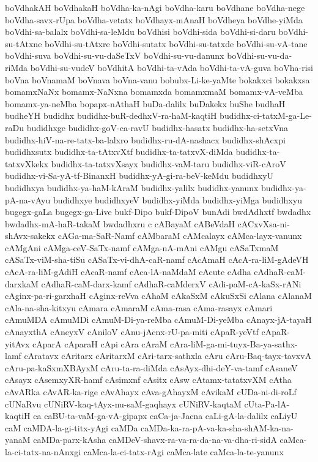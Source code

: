 {boVdhakAH
boVdhakaH
boVdha-ka-nAgi
boVdha-karu
boVdhane
boVdha-nege
boVdha-savx-rUpa
boVdha-vetatx
boVdhayx-mAnaH
boVdheya
boVdhe-yiMda
boVdhi-sa-balalx
boVdhi-sa-leMdu
boVdhisi
boVdhi-sida
boVdhi-si-daru
boVdhi-su-tAtxne
boVdhi-su-tAtxre
boVdhi-sutatx
boVdhi-su-tatxde
boVdhi-su-vA-tane
boVdhi-suva
boVdhi-su-vu-daSeTxV
boVdhi-su-vu-danunx
boVdhi-su-vu-da-riMda
boVdhi-su-vudeV
boVdhitA
boVdhi-ta-vAda
boVdhi-ta-vA-guva
boVha-risi
boVna
boVnamaM
boVnava
boVna-vanu
bobubx-Li-ke-yaMte
bokakxci
bokakxsa
bomamxNaNx
bomamx-NaNxna
bomamxda
bomamxmaM
bomamx-vA-veMba
bomamx-ya-neMba
bopapx-nAthaH
buDa-dalilx
buDakekx
buShe
budhaH
budheYH
budidhx
budidhx-buR-dedhxV-ra-haM-kaqtiH
budidhx-ci-tatxM-ga-Le-raDu
budidhxge
budidhx-goV-ca-ravU
budidhx-hasatx
budidhx-ha-setxVna
budidhx-hiV-na-re-tatx-ba-lalxro
budidhx-ru-dA-nashacx
budidhx-shAcxpi
budidhxsutx
budidhx-ta-tAtxvXtf
budidhx-ta-tatxvX-diMda
budidhx-ta-tatxvXkekx
budidhx-ta-tatxvXsayx
budidhx-vaM-taru
budidhx-viR-cAroV
budidhx-vi-Sa-yA-tf-BinanxH
budidhx-yA-gi-ra-beV-keMdu
budidhxyU
budidhxya
budidhx-ya-haM-kAraM
budidhx-yalilx
budidhx-yanunx
budidhx-ya-pA-na-vAyu
budidhxye
budidhxyeV
budidhx-yiMda
budidhx-yiMga
budidhxyu
bugegx-gaLa
bugegx-ga-Live
bukf-Dipo
bukf-DipoV
bunAdi
bwdAdhxtf
bwdadhx
bwdadhx-mA-haR-takaM
bwdadhxru
c
cABayaM
cABeVdaH
cACxvXsa-ni-shAvx-sakekx
cAGa-ma-SaR-Namf
cAMbaraM
cAMcalayx
cAMca-layx-vanunx
cAMgAni
cAMga-ceV-SaTx-namf
cAMga-nA-mAni
cAMgu
cASaTxmaM
cASaTx-viM-sha-tiSu
cASaTx-vi-dhA-caR-namf
cAcAmaH
cAcA-ra-liM-gAdeVH
cAcA-ra-liM-gAdiH
cAcaR-namf
cAca-lA-naMdaM
cAcute
cAdha
cAdhaR-caM-darxkaM
cAdhaR-caM-darx-kamf
cAdhaR-caMderxV
cAdi-paM-cA-kaSx-rANi
cAginx-pa-ri-garxhaH
cAginx-reVva
cAhaM
cAkaSxM
cAkuSxSi
cAlana
cAlanaM
cAla-na-sha-kitxyu
cAmara
cAmaraM
cAma-rasa
cAma-rasayx
cAmari
cAmuMDA
cAmuMDi
cAmuM-Di-ya-reMba
cAmuM-Di-yeMba
cAnayx-jA-tayaH
cAnayxthA
cAneyxV
cAniloV
cAnu-jAcnx-rU-pa-miti
cApaR-yeVtf
cApaR-yitAvx
cAparA
cAparaH
cApi
cAra
cAraM
cAra-liM-ga-mi-tuyx-Ba-ya-sathx-lamf
cAratavx
cAritarx
cAritarxM
cAri-tarx-sathxla
cAru
cAru-Baq-tayx-tavxvA
cAru-pa-kaSxmXBAyxM
cAru-ta-ra-diMda
cAsAyx-dhi-deY-va-tamf
cAsaneV
cAsayx
cAsemxyXR-hamf
cAsimxnf
cAsitx
cAsw
cAtamx-tatatxvXM
cAtha
cAvARka
cAvAR-ka-rige
cAvAhayx
cAva-gAhayxM
cAvikaM
cUDa-ni-di-roLf
cUNaRvu
cUNiRV-kaq-tAyx-nu-saM-gaqhayx
cUNiRV-kaqtaM
cUta-Pa-lA-kaqtiH
ca
caBU-ta-vaM-ga-vA-gipapx
caCa-ja-Jacna
caLi-gA-la-dalilx
caLiyU
caM
caMDA-la-gi-titx-yAgi
caMDa
caMDa-ka-ra-pA-va-ka-sha-shAM-ka-na-yanaM
caMDa-parx-kAsha
caMDeV-shavx-ra-va-ra-da-na-va-dha-ri-sidA
caMca-la-ci-tatx-na-nAnxgi
caMca-la-ci-tatx-rAgi
caMca-late
caMca-la-te-yanunx
}

